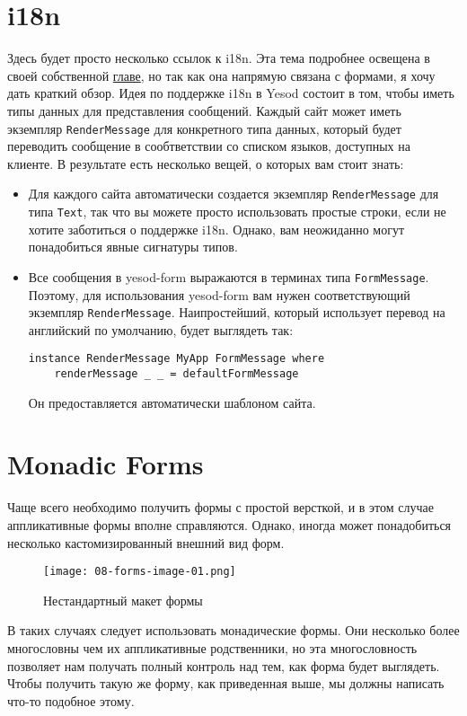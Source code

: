 \section{i18n}
Здесь будет просто несколько ссылок к i18n. Эта тема подробнее освещена в своей
собственной  \hyperref[ch:i18n]{главе},
но так как она напрямую связана с формами, я хочу дать краткий обзор. 
Идея по поддержке i18n в Yesod состоит в том, чтобы иметь типы данных для представления
сообщений. Каждый сайт может иметь экземпляр \lstinline'RenderMessage' для конкретного
типа данных, который будет переводить сообщение в сообтветствии со списком языков,
доступных на клиенте. В результате есть несколько вещей, о которых вам стоит знать:
\begin{itemize}
\item  Для каждого сайта автоматически создается экземпляр \lstinline'RenderMessage' для
типа \lstinline'Text', так что вы можете просто использовать простые строки, если не
хотите заботиться о поддержке i18n. Однако, вам неожиданно могут понадобиться явные
сигнатуры типов.
\item Все сообщения в yesod-form выражаются в терминах типа \lstinline'FormMessage'.
Поэтому, для использования yesod-form вам нужен соответствующий экземпляр 
\lstinline'RenderMessage'. Наипростейший, который использует перевод на английский по
умолчанию, будет выглядеть так:
\begin{lstlisting}
instance RenderMessage MyApp FormMessage where
    renderMessage _ _ = defaultFormMessage
\end{lstlisting}
Он предоставляется автоматически шаблоном сайта.
\end{itemize}

\section{Monadic Forms}
Чаще всего необходимо получить формы с простой версткой, и в этом случае аппликативные формы 
вполне справляются. Однако, иногда может понадобиться несколько кастомизированный 
внешний вид форм.

\begin{figure}[tbph]
  \centering
  \texttt{[image: 08-forms-image-01.png]}
  \caption{Нестандартный макет формы}
\end{figure}
В таких случаях следует использовать монадические формы. Они несколько более 
многословны чем их аппликативные родственники, но эта многословность позволяет нам
получать полный контроль над тем, как форма будет выглядеть. Чтобы получить такую же
форму, как приведенная выше, мы должны написать что-то подобное этому.

